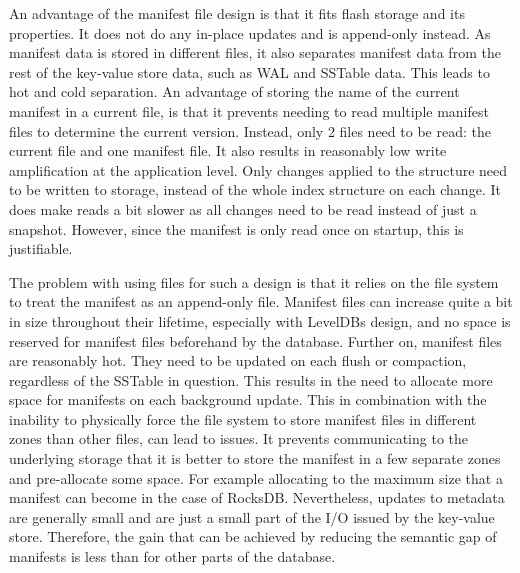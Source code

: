 An advantage of the manifest file design is that it fits flash storage and its properties. It does not do any in-place updates and is append-only instead. As manifest data is stored in different files, it also separates manifest data from the rest of the key-value store data, such as WAL and SSTable data. This leads to hot and cold separation. An advantage of storing the name of the current manifest in a current file, is that it prevents needing to read multiple manifest files to determine the current version. Instead, only 2 files need to be read: the current file and one manifest file. It also results in reasonably low write amplification at the application level. Only changes applied to the structure need to be written to storage, instead of the whole index structure on each change. It does make reads a bit slower as all changes need to be read instead of just a snapshot. However, since the manifest is only read once on startup, this is justifiable.  

The problem with using files for such a design is that it relies on the file system to treat the manifest as an append-only file. Manifest files can increase quite a bit in size throughout their lifetime, especially with LevelDBs design, and no space is reserved for manifest files beforehand by the database. Further on, manifest files are reasonably hot. They need to be updated on each flush or compaction, regardless of the SSTable in question. This results in the need to allocate more space for manifests on each background update. This in combination with the inability to physically force the file system to store manifest files in different zones than other files, can lead to issues. It prevents communicating to the underlying storage that it is better to store the manifest in a few separate zones and pre-allocate some space. For example allocating to the maximum size that a manifest can become in the case of RocksDB. Nevertheless, updates to metadata are generally small and are just a small part of the I/O issued by the key-value store. Therefore, the gain that can be achieved by reducing the semantic gap of manifests is less than for other parts of the database. 


